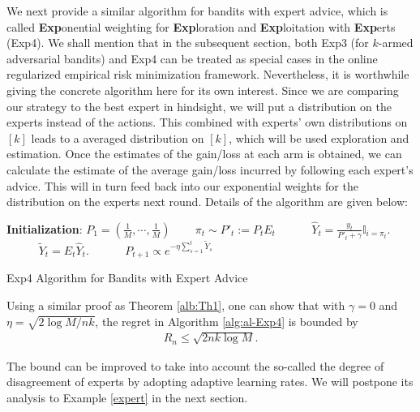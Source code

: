 \documentclass[letterpaper,11pt,openright,openany]{book}
\numberwithin{equation}{section}
\theoremstyle{plain}
\theoremstyle{definition}
\begin{document}
We next provide a similar algorithm for bandits with expert advice, which is called \textbf{Exp}onential weighting for \textbf{Exp}loration and \textbf{Exp}loitation with \textbf{Exp}erts (Exp4). We shall mention that in the subsequent section, both Exp3 (for $k$-armed adversarial bandits) and Exp4 can be treated as special cases in the online regularized empirical risk minimization framework. 
Nevertheless, it is worthwhile giving the concrete algorithm here for its own interest. 
Since we are comparing our strategy to the best expert in hindsight, we will put a distribution on the experts instead of the actions. This combined with experts' own distributions on $[k]$ leads to a averaged distribution on $[k]$, which will be used exploration and estimation. Once the estimates of the gain/loss at each arm is obtained, we can calculate the estimate of the average gain/loss incurred by following each expert's advice. This will in turn feed back into our exponential weights for the distribution on the experts next round. Details of the algorithm are given below:


\begin{algorithm}[H]
 \begin{algorithmic}[1]
 \STATE \textbf{Initialization}: $P_1 = (\frac{1}{M}, \cdots, \frac{1}{M})$ \ \ \ 
 \STATE $\pi_t\sim P'_t := P_tE_t$  \ \ \ \ \ 
 \STATE $\displaystyle\hat{Y}_t = \frac{y_t}{P'_t+\gamma}\mathbb I_{i=\pi_t}$. \ \ \ \ \ 
 \STATE $\displaystyle\tilde{Y}_t = E_t\hat{Y}_t$. \ \ \ \ \ 
 \STATE $P_{t+1}\propto e^{-\eta\sum_{s=1}^t\tilde{Y}_s}$ \ \ \ \ \ 
\ENDFOR
\end{algorithmic}
\caption{Exp4 Algorithm for Bandits with Expert Advice} 
\label{alg:al-Exp4}
\end{algorithm}

Using a similar proof as Theorem \ref{alb:Th1}, one can show that with $\gamma = 0$ and $\eta = \sqrt{2\log M /nk}$, the regret in Algorithm \ref{alg:al-Exp4} is bounded by 
\begin{align*}
R_n \leq \sqrt{2nk\log M}. 
\end{align*}

The bound can be improved to take into account the so-called the degree of disagreement of experts by adopting adaptive learning rates. We will postpone its analysis to Example \ref{expert} in the next section. 
\end{document}
